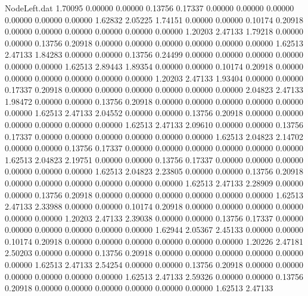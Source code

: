 \begin{filecontents}{NodeLeft.dat}
   1.70095    0.00000    0.00000     0.13756    0.17337    0.00000    0.00000    0.00000    0.00000    0.00000    0.00000    1.62832    2.05225
   1.74151    0.00000    0.00000     0.10174    0.20918    0.00000    0.00000    0.00000    0.00000    0.00000    0.00000    1.20203    2.47133
   1.79218    0.00000    0.00000     0.13756    0.20918    0.00000    0.00000    0.00000    0.00000    0.00000    0.00000    1.62513    2.47133
   1.84283    0.00000    0.00000     0.13756    0.24499    0.00000    0.00000    0.00000    0.00000    0.00000    0.00000    1.62513    2.89443
   1.89354    0.00000    0.00000     0.10174    0.20918    0.00000    0.00000    0.00000    0.00000    0.00000    0.00000    1.20203    2.47133
   1.93404    0.00000    0.00000     0.17337    0.20918    0.00000    0.00000    0.00000    0.00000    0.00000    0.00000    2.04823    2.47133
   1.98472    0.00000    0.00000     0.13756    0.20918    0.00000    0.00000    0.00000    0.00000    0.00000    0.00000    1.62513    2.47133
   2.04552    0.00000    0.00000     0.13756    0.20918    0.00000    0.00000    0.00000    0.00000    0.00000    0.00000    1.62513    2.47133
   2.09610    0.00000    0.00000     0.13756    0.17337    0.00000    0.00000    0.00000    0.00000    0.00000    0.00000    1.62513    2.04823
   2.14702    0.00000    0.00000     0.13756    0.17337    0.00000    0.00000    0.00000    0.00000    0.00000    0.00000    1.62513    2.04823
   2.19751    0.00000    0.00000     0.13756    0.17337    0.00000    0.00000    0.00000    0.00000    0.00000    0.00000    1.62513    2.04823
   2.23805    0.00000    0.00000     0.13756    0.20918    0.00000    0.00000    0.00000    0.00000    0.00000    0.00000    1.62513    2.47133
   2.28909    0.00000    0.00000     0.13756    0.20918    0.00000    0.00000    0.00000    0.00000    0.00000    0.00000    1.62513    2.47133
   2.33988    0.00000    0.00000     0.10174    0.20918    0.00000    0.00000    0.00000    0.00000    0.00000    0.00000    1.20203    2.47133
   2.39038    0.00000    0.00000     0.13756    0.17337    0.00000    0.00000    0.00000    0.00000    0.00000    0.00000    1.62944    2.05367
   2.45133    0.00000    0.00000     0.10174    0.20918    0.00000    0.00000    0.00000    0.00000    0.00000    0.00000    1.20226    2.47181
   2.50203    0.00000    0.00000     0.13756    0.20918    0.00000    0.00000    0.00000    0.00000    0.00000    0.00000    1.62513    2.47133
   2.54254    0.00000    0.00000     0.13756    0.20918    0.00000    0.00000    0.00000    0.00000    0.00000    0.00000    1.62513    2.47133
   2.59326    0.00000    0.00000     0.13756    0.20918    0.00000    0.00000    0.00000    0.00000    0.00000    0.00000    1.62513    2.47133

\end{filecontents}
